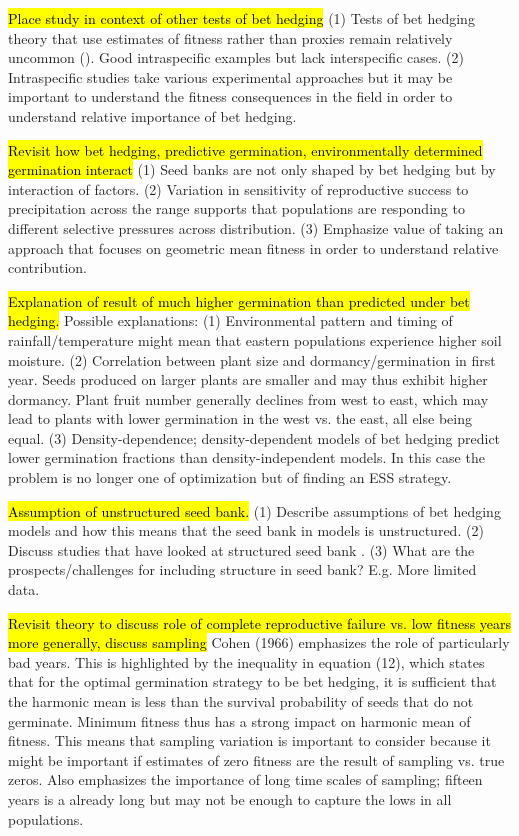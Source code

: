 \documentclass[12pt, oneside]{article}   	%
\begin{document}
\hl{Place study in context of other tests of bet hedging} (1) Tests of bet hedging theory that use estimates of fitness rather than proxies remain relatively uncommon (\cite{simons2011}). Good intraspecific examples but lack interspecific cases. (2) Intraspecific studies take various experimental approaches but it may be important to understand the fitness consequences in the field in order to understand relative importance of bet hedging. 

\hl{Revisit how bet hedging, predictive germination, environmentally determined germination interact} (1) Seed banks are not only shaped by bet hedging but by interaction of factors. (2) Variation in sensitivity of reproductive success to precipitation across the range supports that populations are responding to different selective pressures across distribution. (3) Emphasize value of taking an approach that focuses on geometric mean fitness in order to understand relative contribution.

\hl{Explanation of result of much higher germination than predicted under bet hedging.} Possible explanations: (1) Environmental pattern and timing of rainfall/temperature might mean that eastern populations experience higher soil moisture. (2) Correlation between plant size and dormancy/germination in first year. Seeds produced on larger plants are smaller and may thus exhibit higher dormancy. Plant fruit number generally declines from west to east, which may lead to plants with lower germination in the west vs. the east, all else being equal. (3) Density-dependence; density-dependent models of bet hedging predict lower germination fractions than density-independent models. In this case the problem is no longer one of optimization but of finding an ESS strategy.

\hl{Assumption of unstructured seed bank.} (1) Describe assumptions of bet hedging models and how this means that the seed bank in models is unstructured. (2) Discuss studies that have looked at structured seed bank . (3) What are the prospects/challenges for including structure in seed bank? E.g. More limited data.

\hl{Revisit theory to discuss role of complete reproductive failure vs. low fitness years more generally, discuss sampling} Cohen (1966) emphasizes the role of particularly bad years. This is highlighted by the inequality in equation (12), which states that for the optimal germination strategy to be bet hedging, it is sufficient that the harmonic mean is less than the survival probability of seeds that do not germinate. Minimum fitness thus has a strong impact on harmonic mean of fitness. This means that sampling variation is important to consider because it might be important if estimates of zero fitness are the result of sampling vs. true zeros. Also emphasizes the importance of long time scales of sampling; fifteen years is a already long but may not be enough to capture the lows in all populations. 

 

\end{document}
